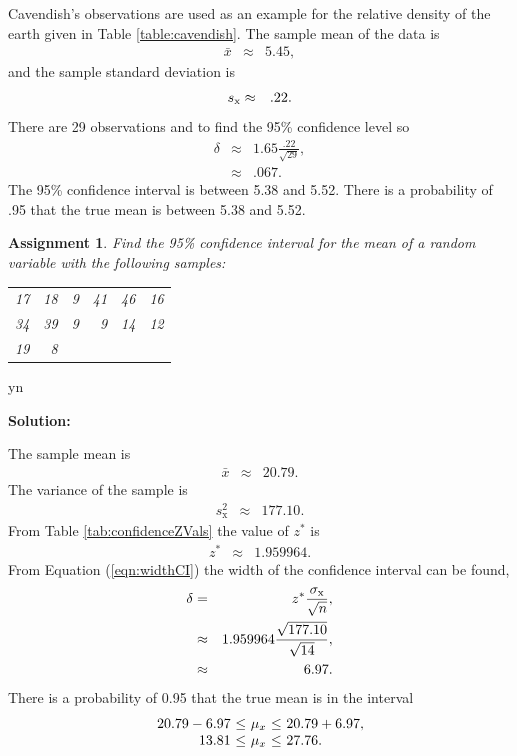 \documentclass[12pt]{article}
\def\solutions{y}
\def\solutions{n}
\newtheorem{assignment}{Assignment}[section]
\begin{document}
Cavendish's observations are used as an example for the relative
density of the earth given in Table \ref{table:cavendish}. The sample
mean of the data is
\begin{eqnarray*}
  \bar{x} & \approx & 5.45,
\end{eqnarray*}
and the sample standard deviation is 
\begin{eqnarray*}
  s_{\rm x} & \approx & .22.
\end{eqnarray*}
There are 29 observations and to find the 95\% confidence level so
\begin{eqnarray*}
  \delta & \approx & 1.65 \frac{.22}{\sqrt{29}}, \\
         & \approx & .067.
\end{eqnarray*}
The 95\% confidence interval is between 5.38 and 5.52. There is a
probability of .95 that the true mean is between 5.38 and 5.52.


\begin{assignment}
  Find the 95\% confidence interval for the mean of a random variable
  with the following samples:
  \begin{center}
    \begin{tabular}{rrrrrr}
      17 & 18 & 9 & 41 & 46 & 16 \\
      34 & 39 & 9 & 9  & 14 & 12 \\
      19 & 8      
    \end{tabular}
  \end{center}
\end{assignment}

\if y\solutions

\textbf{Solution:}

The sample mean is
\begin{eqnarray*}
  \bar{x} & \approx & 20.79.
\end{eqnarray*}
The variance of the sample  is 
\begin{eqnarray*}
  s^2_{\mathrm x} & \approx & 177.10.
\end{eqnarray*}
From Table \ref{tab:confidenceZVals} the value of $z^*$ is
\begin{eqnarray*}
  z^* & \approx & 1.959964.
\end{eqnarray*}
From Equation (\ref{eqn:widthCI}) the width of the confidence interval
can be found,
\begin{eqnarray*}
  \delta & = & z^* \frac{\sigma_{\rm x}}{\sqrt{n}}, \\
  & \approx & 1.959964 \frac{\sqrt{177.10}}{\sqrt{14}}, \\
  & \approx & 6.97.
\end{eqnarray*}
There is a probability of 0.95 that the true mean is in the interval
\begin{eqnarray*}
  \begin{array}{r@{~\leq~}c@{~\leq~}l}
  20.79-6.97 & \mu_x & 20.79+6.97, \\
  13.81 & \mu_x & 27.76.
  \end{array}
\end{eqnarray*}
\end{document}
